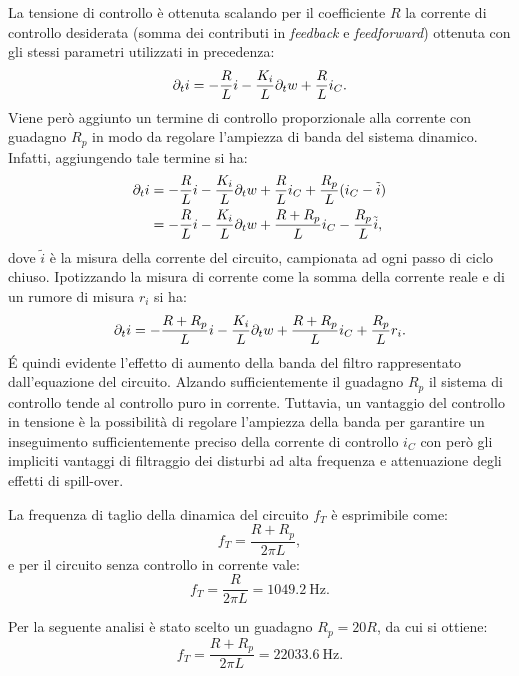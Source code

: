 La tensione di controllo è ottenuta scalando per il coefficiente $R$ la corrente di controllo desiderata (somma dei contributi in \textit{feedback} e \textit{feedforward}) ottenuta con gli stessi parametri utilizzati in precedenza:
\begin{equation}
\label{eq:8tensione2}
\partial_t i = -\frac{R}{L} i -\frac{K_i}{L}\partial_t w + \frac{R}{L}i_C.
\end{equation}
 Viene però aggiunto un termine di controllo proporzionale alla corrente con guadagno $R_p$ in modo da regolare l'ampiezza di banda del sistema dinamico. Infatti, aggiungendo tale termine si ha:
 \begin{align}
\label{eq:8tensione3}
\partial_t i &= -\frac{R}{L} i -\frac{K_i}{L}\partial_t w + \frac{R}{L}i_C+\frac{R_p}{L}(i_C-\tilde{i})\\
& = -\frac{R}{L} i -\frac{K_i}{L}\partial_t w + \frac{R+R_p}{L}i_C-\frac{R_p}{L}\tilde{i},
\end{align}
dove $\tilde{i}$ è la misura della corrente del circuito, campionata ad ogni passo di ciclo chiuso. Ipotizzando la misura di corrente come la somma della corrente reale e di un rumore di misura $r_i$ si ha:
\begin{equation}
\label{eq:8tensione4}
\partial_t i = -\frac{R+R_p}{L} i -\frac{K_i}{L}\partial_t w + \frac{R+R_p}{L}i_C + \frac{R_p}{L}r_i.
\end{equation}
\'E quindi evidente l'effetto di aumento della banda del filtro rappresentato dall'equazione del circuito. Alzando sufficientemente il guadagno $R_p$ il sistema di controllo tende al controllo puro in corrente. Tuttavia, un vantaggio del controllo in tensione è la possibilità di regolare l'ampiezza della banda per garantire un inseguimento sufficientemente preciso della corrente di controllo $i_C$ con però gli impliciti vantaggi di filtraggio dei disturbi ad alta frequenza e attenuazione degli effetti di spill-over. 

La frequenza di taglio della dinamica del circuito $f_T$ è esprimibile come:
\begin{equation}
\label{eq:8tensione5}
f_T = \frac{R+R_p}{2\pi L},
\end{equation}
e per il circuito senza controllo in corrente vale:
\begin{equation}
\label{eq:8tensione6}
f_T = \frac{R}{2\pi L} = 1049.2~\text{Hz}.
\end{equation}
 
Per la seguente analisi è stato scelto un guadagno $R_p = 20 R$, da cui si ottiene:
\begin{equation}
\label{eq:8tensione7}
f_T = \frac{R+R_p}{2\pi L} = 22033.6~\text{Hz}.
\end{equation}

